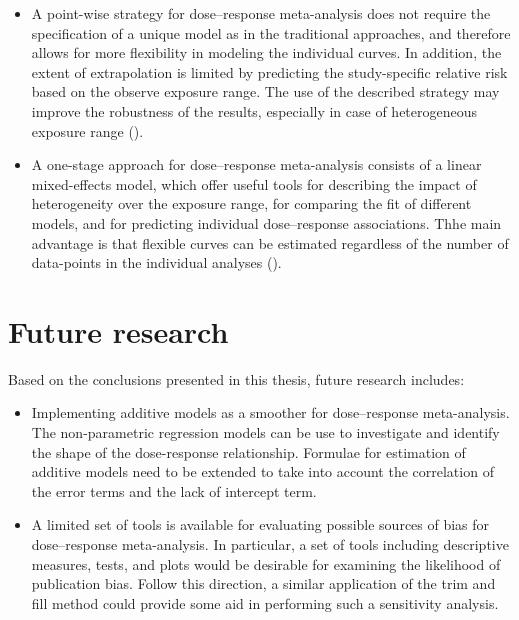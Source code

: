 \documentclass[11pt,a4paper,twoside,openany]{book}\usepackage{knitr}
\begin{document}
{\begin{itemize}
\item A point-wise strategy for dose--response meta-analysis does not require the specification of a unique model as in the traditional approaches, and therefore allows for more flexibility in modeling the individual curves. In addition, the extent of extrapolation is limited by predicting the study-specific relative risk based on the observe exposure range. The use of the described strategy may improve the robustness of the results, especially in case of heterogeneous exposure range ().

\item A one-stage approach for dose--response meta-analysis consists of a linear mixed-effects model, which offer useful tools for describing the impact of heterogeneity over the exposure range, for comparing the fit of different models, and for predicting individual dose--response associations. Thhe main advantage is that flexible curves can be estimated regardless of the number of data-points in the individual analyses ().

\end{itemize}


%

\chapter{Future research}

Based on the conclusions presented in this thesis, future research includes: 

\begin{itemize}
\item Implementing additive models as a smoother for dose--response meta-analysis. The non-parametric regression models can be use to investigate and identify the shape of the dose-response relationship. Formulae for estimation of additive models need to be extended to take into account the correlation of the error terms and the lack of intercept term.

\item A limited set of tools is available for evaluating possible sources of bias for dose--response meta-analysis. In particular, a set of tools including descriptive measures, tests, and plots would be desirable for examining the likelihood of publication bias. Follow this direction, a similar application of the trim and fill method could provide some aid in performing such a sensitivity analysis.


\end{itemize}}
\end{document}
